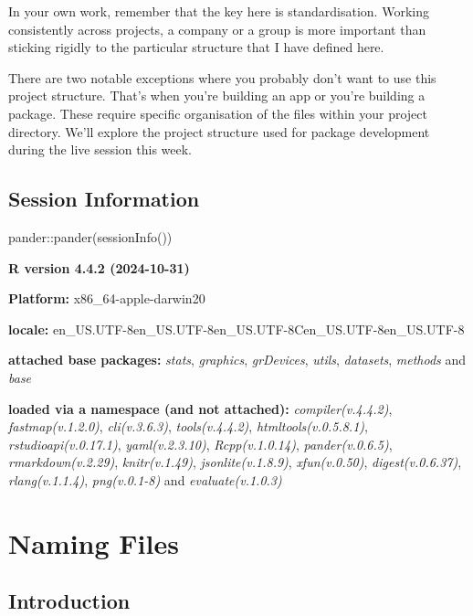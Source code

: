 \documentclass[
  letterpaper,
  DIV=11,
  numbers=noendperiod]{scrreprt}
\newenvironment{Shaded}{\begin{snugshade}}{\end{snugshade}}
\newcommand{\FunctionTok}[1]{\textcolor[rgb]{0.28,0.35,0.67}{#1}}
\newcommand{\NormalTok}[1]{\textcolor[rgb]{0.00,0.23,0.31}{#1}}
\newcommand{\SpecialCharTok}[1]{\textcolor[rgb]{0.37,0.37,0.37}{#1}}
\begin{document}
In your own work, remember that the key here is standardisation. Working
consistently across projects, a company or a group is more important
than sticking rigidly to the particular structure that I have defined
here.

There are two notable exceptions where you probably don't want to use
this project structure. That's when you're building an app or you're
building a package. These require specific organisation of the files
within your project directory. We'll explore the project structure used
for package development during the live session this week.

\section{Session Information}\label{session-information}

\begin{Shaded}
\begin{Highlighting}[]
\NormalTok{pander}\SpecialCharTok{::}\FunctionTok{pander}\NormalTok{(}\FunctionTok{sessionInfo}\NormalTok{())}
\end{Highlighting}
\end{Shaded}

\textbf{R version 4.4.2 (2024-10-31)}

\textbf{Platform:} x86\_64-apple-darwin20

\textbf{locale:}
en\_US.UTF-8\textbar\textbar en\_US.UTF-8\textbar\textbar en\_US.UTF-8\textbar\textbar C\textbar\textbar en\_US.UTF-8\textbar\textbar en\_US.UTF-8

\textbf{attached base packages:} \emph{stats}, \emph{graphics},
\emph{grDevices}, \emph{utils}, \emph{datasets}, \emph{methods} and
\emph{base}

\textbf{loaded via a namespace (and not attached):}
\emph{compiler(v.4.4.2)}, \emph{fastmap(v.1.2.0)}, \emph{cli(v.3.6.3)},
\emph{tools(v.4.4.2)}, \emph{htmltools(v.0.5.8.1)},
\emph{rstudioapi(v.0.17.1)}, \emph{yaml(v.2.3.10)},
\emph{Rcpp(v.1.0.14)}, \emph{pander(v.0.6.5)}, \emph{rmarkdown(v.2.29)},
\emph{knitr(v.1.49)}, \emph{jsonlite(v.1.8.9)}, \emph{xfun(v.0.50)},
\emph{digest(v.0.6.37)}, \emph{rlang(v.1.1.4)}, \emph{png(v.0.1-8)} and
\emph{evaluate(v.1.0.3)}

\chapter{Naming Files}\label{workflows-naming}

\section{Introduction}\label{introduction-1}
\end{document}

